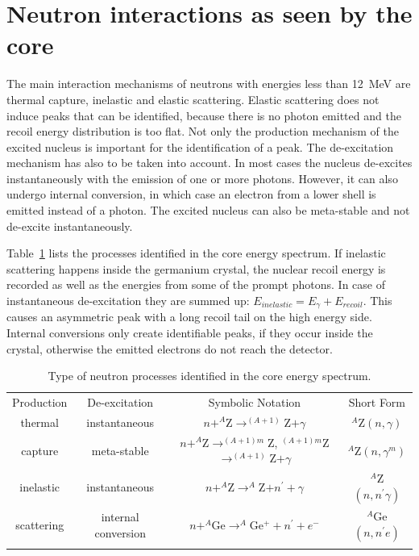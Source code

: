 \section{Neutron interactions as seen by the core}
\label{sec:neu:type}
The main interaction mechanisms of neutrons with energies less than 12~MeV are thermal capture, inelastic and elastic scattering. Elastic scattering does not induce peaks that can be identified, because there is no photon emitted and the recoil energy distribution is too flat. Not only the production mechanism of the excited nucleus is important for the identification of a peak. The de-excitation mechanism has also to be taken into account. In most cases the nucleus de-excites instantaneously with the emission of one or more photons. However, it can also undergo internal conversion, in which case an electron from a lower shell is emitted instead of a photon. The excited nucleus can also be meta-stable and not de-excite instantaneously.

Table~\ref{tab:neu:type} lists the processes identified in the core energy spectrum. If inelastic scattering happens inside the germanium crystal, the nuclear recoil energy is recorded as well as the energies from some of the prompt photons. In case of instantaneous de-excitation they are summed up: $E_{inelastic} = E_{\gamma} + E_{recoil}$. This causes an asymmetric peak with a long recoil tail on the high energy side. Internal conversions only create identifiable peaks, if they occur inside the crystal, otherwise the emitted electrons do not reach the detector.

\begin{table}[tbhp]
  \caption{Type of neutron processes identified in the core energy
spectrum.}
  \label{tab:neu:type}\centering
  \begin{tabular*}{\textwidth}{@{\extracolsep{\fill}}cccc}
    \hline\noalign{\smallskip}
    Production & De-excitation & Symbolic Notation & Short Form \\
    \noalign{\smallskip}\hline\noalign{\smallskip}
    thermal & instantaneous & $n + ^A$Z$ \rightarrow ^{(A+1)}$Z$ +
\gamma$ & $^A$Z$(n,\gamma)$\\
    \noalign{\smallskip}\cline{2-4}\noalign{\smallskip}
    capture & meta-stable 
    & $n + ^A$Z$ \rightarrow ^{(A+1)m}$Z, $^{(A+1)m}$Z$ \rightarrow
^{(A+1)}$Z$+\gamma$ & $^A$Z$(n,\gamma^{m})$\\
    \noalign{\smallskip}\hline\noalign{\smallskip}
    inelastic & instantaneous & 
    $n + ^A$Z$ \rightarrow ^A$Z$ + n^\prime + \gamma$ &
$^A$Z$(n,n^\prime\gamma)$\\
    \noalign{\smallskip}\cline{2-4}\noalign{\smallskip}
    scattering & internal conversion & 
    $n + ^A$Ge$ \rightarrow ^A$Ge$^{+} + n^\prime + e^-$ &
$^A$Ge$(n,n^\prime e)$\\
    \noalign{\smallskip}\hline
  \end{tabular*}
\end{table}

